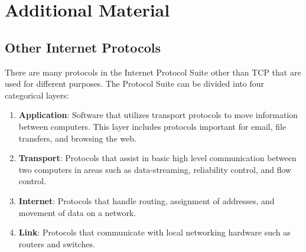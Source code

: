 \begin{comment}
For steps \ref{step:nyc-load-tree}--\ref{step:nyc-query-tree}, recall the following syntax for using a k-d tree in SciPy.
\begin{lstlisting}
from scipy.spatial import KDTree

tree = KDTree(data)                         # Initialize the tree.
min_distance, index = tree.query(target)    # Query for a point.
\end{lstlisting}
\label{prob:wt-analyze-nyc-data}
\end{problem}


\end{comment}
\newpage

\section*{Additional Material} %

\subsection*{Other Internet Protocols}

There are many protocols in the Internet Protocol Suite other than TCP that are used for different purposes.
The Protocol Suite can be divided into four categorical layers:
\begin{enumerate}
\item \textbf{Application}: Software that utilizes transport protocols to move information between computers.
This layer includes protocols important for email, file transfers, and browsing the web.
\item \textbf{Transport}: Protocols that assist in basic high level communication between two computers in areas such as data-streaming, reliability control, and flow control.
\item \textbf{Internet}: Protocols that handle routing, assignment of addresses, and movement of data on a network.
\item \textbf{Link}: Protocols that communicate with local networking hardware such as routers and switches.
\end{enumerate}


